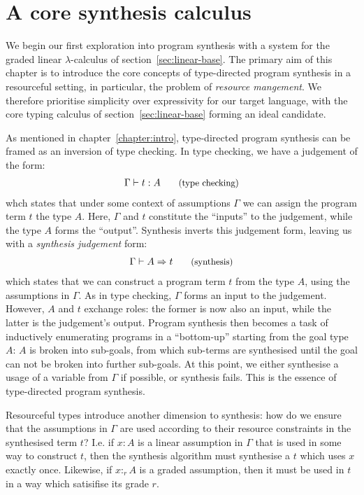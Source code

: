 \chapter{A core synthesis calculus}
\label{chapter:core}
We begin our first exploration into program synthesis with a system for the
graded linear $\lambda$-calculus of section~\ref{sec:linear-base}. The primary
aim of this chapter is to introduce the core concepts of type-directed program
synthesis in a resourceful setting, in particular, the problem of
\textit{resource mangement}. We therefore prioritise simplicity over
expressivity for our target language, with the core typing calculus of
section~\ref{sec:linear-base} forming an ideal candidate.

As mentioned in chapter~\ref{chapter:intro}, type-directed program synthesis can
be framed as an inversion of type checking. In type checking, we have a
judgement of the form: 
\begin{align*}
    \Gamma \vdash t : A {\small{\tag{type checking}}}
\end{align*}
whch states that under some context of assumptions $\Gamma$ we can assign the
program term $t$ the type $A$. Here, $\Gamma$ and $t$ constitute the ``inputs''
to the judgement, while the type $A$ forms the ``output''. Synthesis inverts
this judgement form, leaving us with a \textit{synthesis judgement} form:
\begin{align*}
    \Gamma \vdash A \Rightarrow t {\small{\tag{synthesis}}}
\end{align*}
which states that we can construct a program term $t$ from the type $A$, using
the assumptions in $\Gamma$. As in type checking, $\Gamma$ forms an input to the
judgement. However, $A$ and $t$ exchange roles: the former is now also an input,
while the latter is the judgement's output. Program synthesis then becomes a
task of inductively enumerating programs in a ``bottom-up'' starting from the
goal type $A$: $A$ is broken into sub-goals, from which sub-terms are
synthesised until the goal can not be broken into further sub-goals. At this
point, we either synthesise a usage of a variable from $\Gamma$ if possible, or
synthesis fails. This is the essence of type-directed program synthesis. 

Resourceful types introduce another dimension to synthesis: how do we ensure
that the assumptions in $\Gamma$ are used according to their resource
constraints in the synthesised term $t$? I.e. if $x : A$ is a linear assumption in $\Gamma$
that is used in some way to construct $t$, then the synthesis algorithm must synthesise 
a $t$ which uses $x$ exactly once. Likewise, if $x :_r A$ is a graded assumption, then 
it must be used in $t$ in a way which satisifise its grade $r$.

